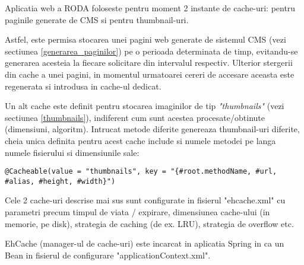 Aplicatia web a RODA foloseste pentru moment 2 instante de cache-uri: pentru paginile generate de CMS si pentru thumbnail-uri.

Astfel, este permisa stocarea unei pagini web generate de sistemul CMS (vezi sectiunea \ref{generarea_paginilor}) 
pe o perioada determinata de timp, evitandu-se generarea acesteia la fiecare solicitare din intervalul respectiv. 
Ulterior stergerii din cache a unei pagini, in momentul urmatoarei cereri de accesare aceasta este regenerata si introdusa in cache-ul dedicat.

Un alt cache este definit pentru stocarea imaginilor de tip \emph{"thumbnails"} (vezi sectiunea \ref{thumbnails}), 
indiferent cum sunt acestea procesate/obtinute (dimensiuni, algoritm).
Intrucat metode diferite genereaza thumbnail-uri diferite, cheia unica definita pentru acest cache include si numele metodei pe langa numele fisierului si dimensiunile sale:
\begin{lstlisting}[breaklines=true]
@Cacheable(value = "thumbnails", key = "{#root.methodName, #url, #alias, #height, #width}")
\end{lstlisting}

Cele 2 cache-uri descrise mai sus sunt configurate in fisierul "ehcache.xml" cu parametri precum timpul de viata / expirare, dimensiunea cache-ului (in memorie, pe disk), strategia de caching (de ex. LRU), strategia de overflow etc.

EhCache (manager-ul de cache-uri) este incarcat in aplicatia Spring in ca un Bean in fisierul de configurare "applicationContext.xml".
